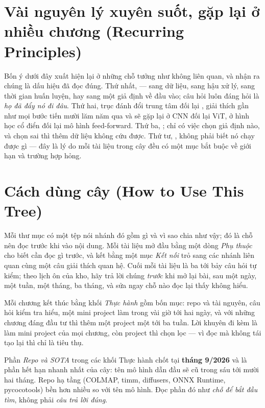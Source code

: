 \documentclass[deep_learning.tex]{subfiles}
\begin{document}
\section*{Vài nguyên lý xuyên suốt, gặp lại ở nhiều chương (Recurring Principles)}

Bốn ý dưới đây xuất hiện lại ở những chỗ tưởng như không liên quan, và nhận ra chúng là dấu hiệu đã đọc đúng. Thứ nhất,  --- sang dữ liệu, sang hậu xử lý, sang thời gian huấn luyện, hay sang một giả định về đầu vào; câu hỏi luôn đáng hỏi là \emph{họ đã đẩy nó đi đâu}. Thứ hai, trục đánh đổi trung tâm  đối lại , giải thích gần như mọi bước tiến mười lăm năm qua và sẽ gặp lại ở CNN đối lại ViT, ở hình học cổ điển đối lại mô hình feed-forward. Thứ ba, ; chỉ có việc chọn giả định nào, và chọn sai thì thêm dữ liệu không cứu được. Thứ tư, , không phải biết nó chạy được gì --- đây là lý do mỗi tài liệu trong cây đều có một mục bắt buộc về giới hạn và trường hợp hỏng.

\section*{Cách dùng cây (How to Use This Tree)}

Mỗi thư mục có một tệp  nói nhánh đó gồm gì và vì sao chia như vậy; đó là chỗ nên đọc trước khi vào nội dung. Mỗi tài liệu mở đầu bằng một dòng \emph{Phụ thuộc} cho biết cần đọc gì trước, và kết bằng một mục \emph{Kết nối} trỏ sang các nhánh liên quan cùng một câu giải thích quan hệ. Cuối mỗi tài liệu là ba tới bảy câu hỏi tự kiểm; theo lịch ôn của kho, hãy trả lời chúng \emph{trước} khi mở lại bài, sau một ngày, một tuần, một tháng, ba tháng, và sửa ngay chỗ nào đọc lại thấy không hiểu.

Mỗi chương kết thúc bằng khối \emph{Thực hành} gồm bốn mục: repo và tài nguyên, câu hỏi kiểm tra hiểu, một mini project làm trong vài giờ tới hai ngày, và với những chương đáng đầu tư thì thêm một project một tới ba tuần. Lời khuyên đi kèm là làm mini project của mọi chương, còn project thì chọn lọc --- vì đọc mà không tái tạo lại thì chỉ là tiêu thụ.

\begin{cambay}
Phần \emph{Repo và SOTA} trong các khối Thực hành chốt tại \textbf{tháng 9/2026} và là phần hết hạn nhanh nhất của cây: tên mô hình dẫn đầu sẽ cũ trong sáu tới mười hai tháng. Repo hạ tầng (COLMAP, timm, diffusers, ONNX Runtime, pycocotools) bền hơn nhiều so với tên mô hình. Đọc phần đó như \emph{chỗ để bắt đầu tìm}, không phải \emph{câu trả lời đúng}.
\end{cambay}
\end{document}
